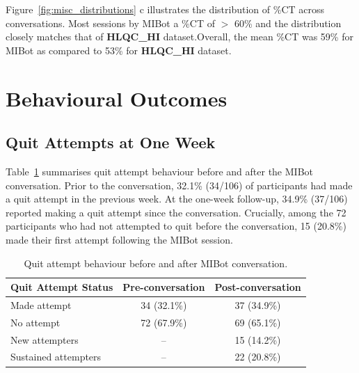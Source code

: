 Figure~\ref{fig:misc_distributions} c illustrates the distribution of \%CT across conversations. Most sessions by MIBot a \%CT of $>$ 60\% and the distribution closely matches that of \textbf{HLQC\_HI} dataset.Overall, the mean \%CT was 59\% for MIBot as compared to 53\% for \textbf{HLQC\_HI} dataset.


































\section{Behavioural Outcomes}


\label{sec:behavioural-outcomes}

\subsection{Quit Attempts at One Week}

Table~\ref{table:quit_attempts} summarises quit attempt behaviour before and after the MIBot conversation. Prior to the conversation, 32.1\% (34/106) of participants had made a quit attempt in the previous week. At the one-week follow-up, 34.9\% (37/106) reported making a quit attempt since the conversation. Crucially, among the 72 participants who had not attempted to quit before the conversation, 15 (20.8\%) made their first attempt following the MIBot session.

\begin{table}[ht]
  \centering
  \small
  \setlength{\tabcolsep}{4pt}
  \renewcommand{\arraystretch}{1.1}
  \begin{tabular}{@{}lcc@{}}
    \toprule
    \textbf{Quit Attempt Status} & \textbf{Pre-conversation} & \textbf{Post-conversation} \\
    \midrule
    Made attempt & 34 (32.1\%) & 37 (34.9\%) \\
    No attempt & 72 (67.9\%) & 69 (65.1\%) \\
    \midrule
    New attempters & -- & 15 (14.2\%) \\
    Sustained attempters & -- & 22 (20.8\%) \\
    \bottomrule
  \end{tabular}
  \caption{Quit attempt behaviour before and after MIBot conversation.}
  \label{table:quit_attempts}
\end{table}

